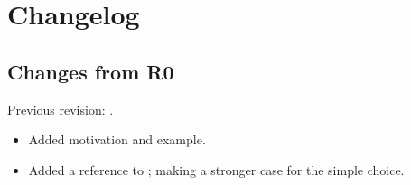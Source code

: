 \section{Changelog}
\subsection{Changes from R0}
Previous revision: \parencite{P0917R0}.
\begin{itemize}
  \item Added  motivation and example.
  \item Added a reference to \cite{P0927R0}; making a stronger case for the simple choice.
\end{itemize}

